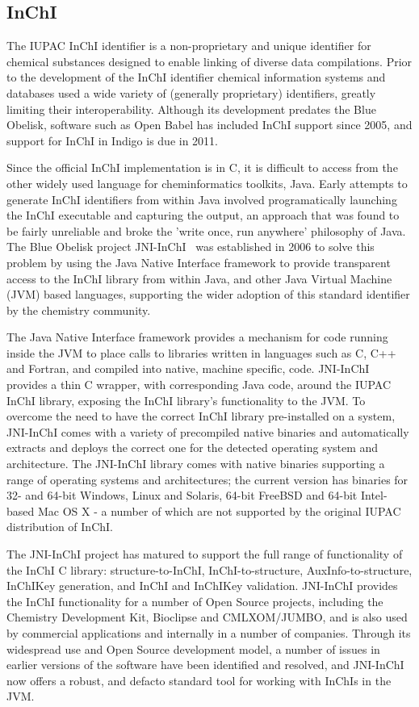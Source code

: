 \documentclass[10pt]{bmc_article}
\newenvironment{bmcformat}{\fussy\setboolean{publ}{true}}{\fussy}
\begin{document}
\begin{bmcformat}
  \subsection*{InChI}

The IUPAC InChI identifier is a non-proprietary and unique identifier
for chemical substances designed to enable linking of diverse data
compilations. Prior to the development of the InChI identifier chemical
information systems and databases used a wide variety of (generally
proprietary) identifiers, greatly limiting their interoperability.
Although its development predates the Blue Obelisk, software such as Open
Babel has included InChI support since 2005, and support for InChI in
Indigo is due in 2011.

Since the official InChI implementation is in C, it is difficult to
access from the other widely used language for cheminformatics
toolkits, Java. Early attempts to generate InChI identifiers from
within Java involved programatically launching the InChI executable
and capturing the output, an approach that was found to be fairly
unreliable and broke the 'write once, run anywhere' philosophy
of Java.  The Blue Obelisk project JNI-InChI~\cite{WebJNIInChI}
was established in 2006 to solve this problem by using the Java Native
Interface framework to provide transparent access to the InChI
library from within Java, and other Java Virtual Machine (JVM) based
languages, supporting the wider adoption of
this standard identifier by the chemistry community.

The Java Native Interface framework provides a mechanism for code
running inside the JVM to place calls to libraries written in languages
such as C, C++ and Fortran, and compiled into native, machine specific,
code. JNI-InChI provides a thin C wrapper, with corresponding Java code,
around the IUPAC InChI library, exposing the InChI library's functionality
to the JVM.  To overcome the need to have the correct InChI library pre-installed
on a system, JNI-InChI comes with a variety of precompiled native binaries and
automatically extracts and deploys the correct one for the detected operating
system and architecture. The JNI-InChI library comes with native binaries
supporting a range of operating systems and architectures; the current version
has binaries for 32- and 64-bit Windows, Linux and Solaris, 64-bit FreeBSD
and 64-bit Intel-based Mac OS X - a number of which are not supported by the
original IUPAC distribution of InChI.

The JNI-InChI project has matured to support the full range of
functionality of the InChI C library: structure-to-InChI, InChI-to-structure,
AuxInfo-to-structure, InChIKey generation, and InChI and InChIKey validation.
JNI-InChI provides the InChI functionality for a number of Open Source projects,
including the Chemistry Development Kit, Bioclipse and CMLXOM/JUMBO, and is
also used by commercial applications and internally in a number of companies.
Through its widespread use and Open Source development model, a number of
issues in earlier versions of the software have been identified and resolved,
and JNI-InChI now offers a robust, and defacto standard tool for working with
InChIs in the JVM.



\end{bmcformat}
\end{document}
